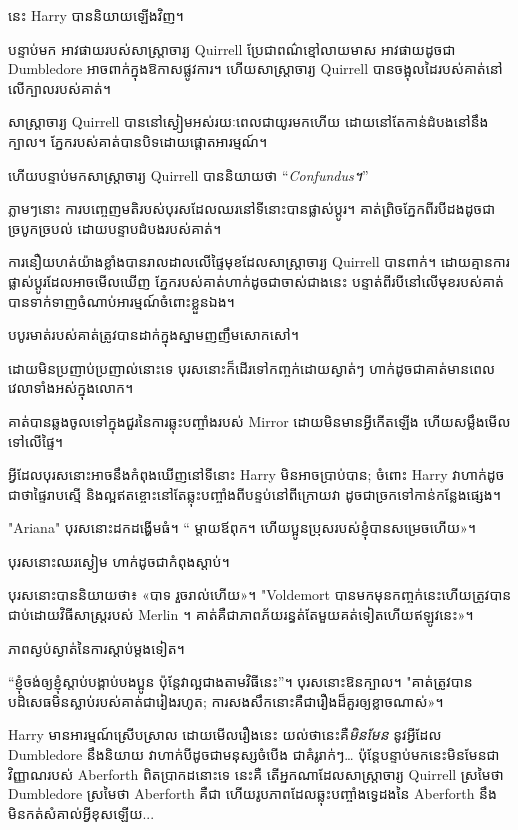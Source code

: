 {{នេះ Harry បាននិយាយឡើងវិញ។

បន្ទាប់មក អាវផាយរបស់សាស្រ្តាចារ្យ Quirrell ប្រែជាពណ៌ខ្មៅលាយមាស អាវផាយដូចជា Dumbledore អាចពាក់ក្នុងឱកាសផ្លូវការ។ ហើយសាស្រ្តាចារ្យ Quirrell បានចង្អុលដៃរបស់គាត់នៅលើក្បាលរបស់គាត់។

សាស្ត្រាចារ្យ Quirrell បាន​នៅ​ស្ងៀម​អស់​រយៈ​ពេល​ជា​យូរ​មក​ហើយ ដោយ​នៅ​តែ​កាន់​ដំបង​នៅ​នឹង​ក្បាល។ ភ្នែករបស់គាត់បានបិទដោយផ្តោតអារម្មណ៍។

ហើយបន្ទាប់មកសាស្រ្តាចារ្យ Quirrell បាននិយាយថា “\emph{Confundus។}”

ភ្លាមៗនោះ ការបញ្ចេញមតិរបស់បុរសដែលឈរនៅទីនោះបានផ្លាស់ប្តូរ។ គាត់​ព្រិច​ភ្នែក​ពីរបី​ដង​ដូច​ជា​ច្របូកច្របល់ ដោយ​បន្ទាប​ដំបង​របស់គាត់។

ការនឿយហត់យ៉ាងខ្លាំងបានរាលដាលលើផ្ទៃមុខដែលសាស្រ្តាចារ្យ Quirrell បានពាក់។ ដោយគ្មានការផ្លាស់ប្តូរដែលអាចមើលឃើញ ភ្នែករបស់គាត់ហាក់ដូចជាចាស់ជាងនេះ បន្ទាត់ពីរបីនៅលើមុខរបស់គាត់បានទាក់ទាញចំណាប់អារម្មណ៍ចំពោះខ្លួនឯង។

បបូរមាត់​របស់​គាត់​ត្រូវ​បាន​ដាក់​ក្នុង​ស្នាម​ញញឹម​សោកសៅ។

ដោយ​មិន​ប្រញាប់​ប្រញាល់​នោះ​ទេ បុរស​នោះ​ក៏​ដើរ​ទៅ​កញ្ចក់​ដោយ​ស្ងាត់​ៗ ហាក់​ដូច​ជា​គាត់​មាន​ពេល​វេលា​ទាំង​អស់​ក្នុង​លោក។

គាត់បានឆ្លងចូលទៅក្នុងជួរនៃការឆ្លុះបញ្ចាំងរបស់ Mirror ដោយមិនមានអ្វីកើតឡើង ហើយសម្លឹងមើលទៅលើផ្ទៃ។

អ្វី​ដែល​បុរស​នោះ​អាច​នឹង​កំពុង​ឃើញ​នៅ​ទី​នោះ Harry មិន​អាច​ប្រាប់​បាន; ចំពោះ Harry វាហាក់ដូចជាថាផ្ទៃរាបស្មើ និងល្អឥតខ្ចោះនៅតែឆ្លុះបញ្ចាំងពីបន្ទប់នៅពីក្រោយវា ដូចជាច្រកទៅកាន់កន្លែងផ្សេង។

"Ariana" បុរសនោះដកដង្ហើមធំ។ “ ម្តាយឪពុក។ ហើយ​ប្អូន​ប្រុស​របស់​ខ្ញុំ​បាន​សម្រេច​ហើយ»។

បុរសនោះឈរស្ងៀម ហាក់ដូចជាកំពុងស្តាប់។

បុរស​នោះ​បាន​និយាយ​ថា​៖ «​បាទ រួចរាល់​ហើយ»។ "Voldemort បានមកមុនកញ្ចក់នេះហើយត្រូវបានជាប់ដោយវិធីសាស្ត្ររបស់ Merlin ។ គាត់​គឺ​ជា​ភាព​ភ័យ​រន្ធត់​តែ​មួយ​គត់​ទៀត​ហើយ​ឥឡូវ​នេះ»។

ភាពស្ងប់ស្ងាត់នៃការស្តាប់ម្តងទៀត។

“ខ្ញុំ​ចង់​ឲ្យ​ខ្ញុំ​ស្តាប់​បង្គាប់​បង​ប្អូន ប៉ុន្តែ​វា​ល្អ​ជាង​តាម​វិធី​នេះ”។ បុរសនោះឱនក្បាល។ "គាត់ត្រូវបានបដិសេធមិនស្លាប់របស់គាត់ជារៀងរហូត; ការ​សងសឹក​នោះ​គឺ​ជា​រឿង​ដ៏​គួរ​ឲ្យ​ខ្លាច​ណាស់»។

Harry មានអារម្មណ៍ស្រើបស្រាល ដោយមើលរឿងនេះ យល់ថានេះគឺ\emph{មិនមែន} នូវអ្វីដែល Dumbledore នឹងនិយាយ វាហាក់បីដូចជាមនុស្សចំបើង ជាគំរូរាក់ៗ… ប៉ុន្តែបន្ទាប់មកនេះមិនមែនជាវិញ្ញាណរបស់ Aberforth ពិតប្រាកដនោះទេ នេះគឺ តើអ្នកណាដែលសាស្រ្តាចារ្យ Quirrell ស្រមៃថា Dumbledore ស្រមៃថា Aberforth គឺជា ហើយរូបភាពដែលឆ្លុះបញ្ចាំងទ្វេដងនៃ Aberforth នឹងមិនកត់សំគាល់អ្វីខុសឡើយ...

}}
